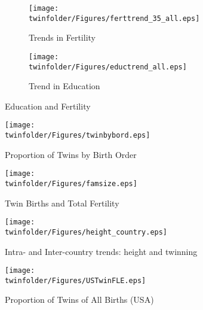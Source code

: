 \begin{figure}[htpb!]
\centering
\begin{subfigure}{.5\textwidth}
  \centering
  \texttt{[image: \\twinfolder/Figures/ferttrend\_35\_all.eps]}
  \caption{Trends in Fertility}
  \label{TWINfig:fertrend}
\end{subfigure}%
\begin{subfigure}{.5\textwidth}
  \centering
  \texttt{[image: \\twinfolder/Figures/eductrend\_all.eps]}
  \caption{Trend in Education}
  \label{TWINfig:eductrend}
\end{subfigure}
\caption{Education and Fertility}
\label{TWINfig:trends}
\end{figure}
\vspace{1cm}

\begin{figure}[htpb!]
\begin{center}
\caption{Proportion of Twins by Birth Order}
\label{TWINfig:bord}
\texttt{[image: \\twinfolder/Figures/twinbybord.eps]} 
\end{center}
\end{figure}

\begin{figure}[htpb!]
\begin{center}
\caption{Twin Births and Total Fertility}
\label{TWINfig:births}
\texttt{[image: \\twinfolder/Figures/famsize.eps]} 
\end{center}
\end{figure}

\begin{figure}[htpb!]
\begin{center}
\caption{Intra- and Inter-country trends: height and twinning}
\label{TWINfig:arrows}
\texttt{[image: \\twinfolder/Figures/height\_country.eps]} 
\end{center}
\end{figure}

\begin{figure}[htpb!]
\begin{center}
\caption{Proportion of Twins of All Births (USA)}
\label{TWINfig:USTwin}
\texttt{[image: \\twinfolder/Figures/USTwinFLE.eps]} 
\end{center}
\end{figure}


